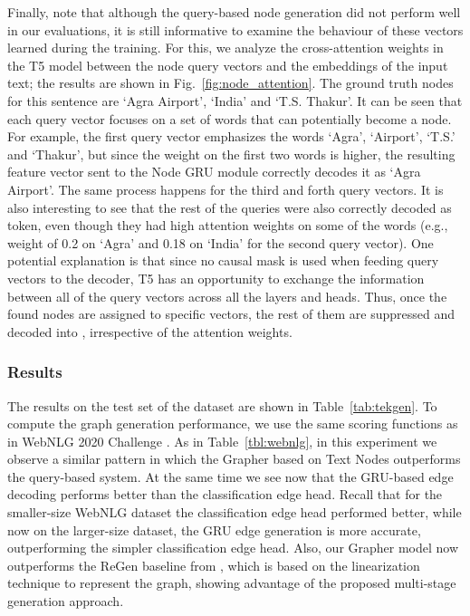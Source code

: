 Finally, note that although the query-based node generation did not perform well in our evaluations, it is still informative to examine the behaviour of these vectors learned during the training. For this, we analyze the cross-attention weights in the T5 model between the node query vectors and the embeddings of the input text; the results are shown in Fig.~\ref{fig:node_attention}. The ground truth nodes for this sentence are `Agra Airport', `India' and `T.S. Thakur'. It can be seen that each query vector focuses on a set of words that can potentially become a node. For example, the first query vector emphasizes the words `Agra', `Airport', `T.S.' and `Thakur', but since the weight on the first two words is higher, the resulting feature vector sent to the Node GRU module correctly decodes it as `Agra Airport'. The same process happens for the third and forth query vectors. It is also interesting to see that the rest of the queries were also correctly decoded as  token, even though they had high attention weights on some of the words (e.g., weight of 0.2 on `Agra' and 0.18 on `India' for the second query vector). One potential explanation is that since no causal mask is used when feeding query vectors to the decoder, T5 has an opportunity to exchange the information between all of the query vectors across all the layers and heads. Thus, once the found nodes are assigned to specific vectors, the rest of them are suppressed and decoded into , irrespective of the attention weights.




\subsubsection{\tekgen Results}


The results on the test set of the \tekgen dataset \cite{agarwal2021knowledge} are shown in Table~\ref{tab:tekgen}. To compute the graph generation performance, we use the same scoring functions as in WebNLG 2020 Challenge \cite{Ferreira2020The2B}. As in Table~\ref{tbl:webnlg}, in this experiment we observe a similar pattern in which the Grapher based on Text Nodes outperforms the query-based system. At the same time we see now that the GRU-based edge decoding performs better than the classification edge head. Recall that for the smaller-size WebNLG dataset the classification edge head performed better, while now on the larger-size \tekgen dataset, the GRU edge generation is more accurate, outperforming the simpler classification edge head. Also, our Grapher model now outperforms the ReGen baseline from \cite{dognin2021regen}, which is based on the linearization technique to represent the graph, showing advantage of the proposed multi-stage generation approach.



